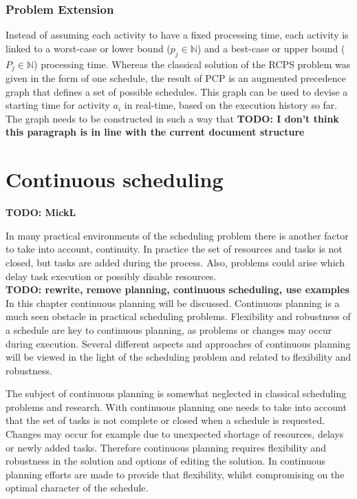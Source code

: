 \documentclass{article}
\newcommand{\TODO}[1]{{\color{red}\textbf{TODO: #1}}}
\begin{document}
\subsubsection{Problem Extension}
Instead of assuming each activity to have a fixed processing time, each activity is linked to a worst-case or lower bound ($p_{j} \in \mathbb{N}$) and a best-case or upper bound ($P_{j} \in \mathbb{N}$) processing time.
Whereas the classical solution of the RCPS problem was given in the form of one schedule, the result of PCP is an augmented precedence graph that defines a set of possible schedules.
This graph can be used to devise a starting time for activity $a_i$ in real-time, based on the execution history so far.
The graph needs to be constructed in such a way that 
\TODO{I don't think this paragraph is in line with the current document structure}

\newpage

\section{Continuous scheduling}
\TODO{MickL}

In many practical environments of the scheduling problem there is another factor to take into account, continuity.
In practice the set of resources and tasks is not closed, but tasks are added during the process.
Also, problems could arise which delay task execution or possibly disable resources.
\\

\TODO{rewrite, remove planning, continuous scheduling, use examples}\\
In this chapter continuous planning will be discussed.
Continuous planning is a much seen obstacle in practical scheduling problems.
Flexibility and robustness of a schedule are key to continuous planning, as problems or changes may occur during execution.
Several different aspects and approaches of continuous planning will be viewed in the light of the scheduling problem and related to flexibility and robustness.

The subject of continuous planning is somewhat neglected in classical scheduling problems and research.
With continuous planning one needs to take into account that the set of tasks is not complete or closed when a schedule is requested.
Changes may occur for example due to unexpected shortage of resources, delays or newly added tasks.
Therefore continuous planning requires flexibility and robustness in the solution and options of editing the solution.
In continuous planning efforts are made to provide that flexibility, whilst compromising on the optimal character of the schedule.
\end{document}
